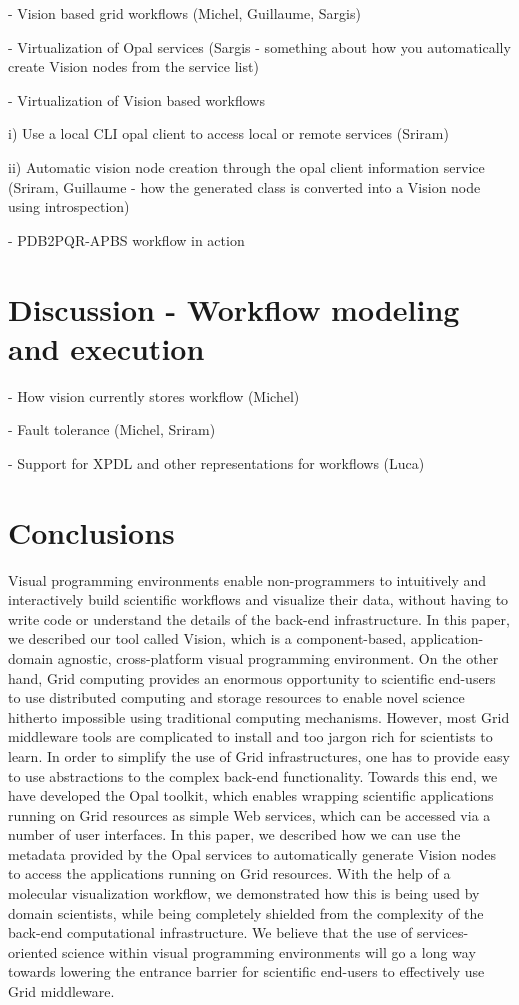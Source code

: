 \documentclass[conference]{IEEEtran}
\begin{document}
- Vision based grid workflows (Michel, Guillaume, Sargis)

- Virtualization of Opal services (Sargis - something about how you
automatically create Vision nodes from the service list)

- Virtualization of Vision based workflows

  i) Use a local CLI opal client to access local or remote services (Sriram)

 ii) Automatic vision node creation through the opal client information
 service (Sriram, Guillaume - how the generated class is converted into a Vision node using introspection)

- PDB2PQR-APBS workflow in action

\section {Discussion - Workflow modeling and execution}

- How vision currently stores workflow (Michel)

- Fault tolerance (Michel, Sriram)

- Support for XPDL and other representations for workflows (Luca)

\section {Conclusions}

Visual programming environments enable non-programmers to intuitively and
interactively build scientific workflows and visualize their data, without
having to write code or understand the details of the back-end
infrastructure. In this paper, we described our tool called Vision, which
is a component-based, application-domain agnostic, cross-platform visual
programming environment. On the other hand, Grid computing provides an
enormous opportunity to scientific end-users to use distributed computing
and storage resources to enable novel science hitherto impossible using
traditional computing mechanisms. However, most Grid middleware tools are
complicated to install and too jargon rich for scientists to learn. In
order to simplify the use of Grid infrastructures, one has to provide easy
to use abstractions to the complex back-end functionality. Towards this
end, we have developed the Opal toolkit, which enables wrapping scientific
applications running on Grid resources as simple Web services, which can be
accessed via a number of user interfaces. In this paper, we described how
we can use the metadata provided by the Opal services to automatically
generate Vision nodes to access the applications running on Grid resources.
With the help of a molecular visualization workflow, we demonstrated how
this is being used by domain scientists, while being completely shielded
from the complexity of the back-end computational infrastructure. We
believe that the use of services-oriented science within visual programming
environments will go a long way towards lowering the entrance barrier for
scientific end-users to effectively use Grid middleware.
\end{document}
